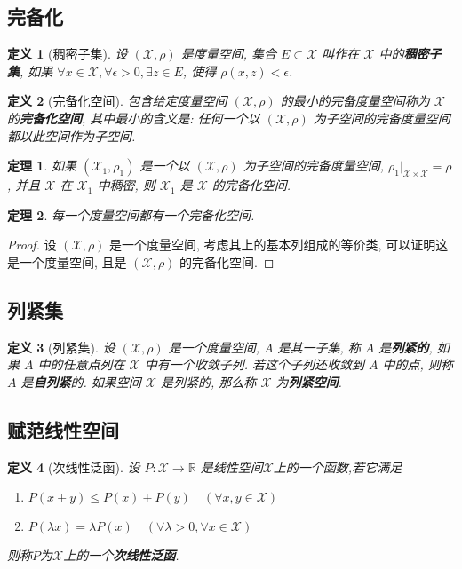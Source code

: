 \documentclass[12pt,a4paper]{article}
\newtheorem{thm}{定理}[subsection]  %
\newtheorem{definition}{定义}[subsection] %
\begin{document}
\subsection{完备化}
\begin{definition}[稠密子集]
    设 $(\mathscr{X},\rho)$ 是度量空间, 集合 $E \subset \mathscr{X}$ 叫作在 $\mathscr{X}$ 中的\textbf{稠密子集}, 如果 $\forall x \in \mathscr{X}, \forall \epsilon > 0, \exists z \in E$, 使得
     $\rho(x,z) < \epsilon$. 
\end{definition}

\begin{definition}[完备化空间]
    包含给定度量空间 $(\mathscr{X},\rho)$ 的最小的完备度量空间称为 $\mathscr{X}$ 的\textbf{完备化空间}, 其中最小的含义是: 任何一个以 $(\mathscr{X},\rho)$ 为子空间的完备度量空间都以此空间作为子空间.
\end{definition}

\begin{thm}
    如果 $(\mathscr{X}_1, \rho_1)$ 是一个以 $(\mathscr{X}, \rho)$ 为子空间的完备度量空间, $\rho_1 | _{\mathscr{X} \times \mathscr{X}} = \rho$, 并且 $\mathscr{X}$ 在 $\mathscr{X}_1$ 中稠密, 则 $\mathscr{X}_1$ 是 $\mathscr{X}$ 的完备化空间.
\end{thm}

\begin{thm}
    每一个度量空间都有一个完备化空间.
\end{thm}
\begin{proof}
    设 $(\mathscr{X}, \rho)$ 是一个度量空间, 考虑其上的基本列组成的等价类, 可以证明这是一个度量空间, 且是 $(\mathscr{X}, \rho)$ 的完备化空间.
\end{proof}

\subsection{列紧集}
\begin{definition}[列紧集]
    设 $(\mathscr{X}, \rho)$ 是一个度量空间, $A$ 是其一子集, 称 $A$ 是\textbf{列紧的}, 如果 $A$ 中的任意点列在 $\mathscr{X}$ 中有一个收敛子列. 
    若这个子列还收敛到 $A$ 中的点, 则称 $A$ 是\textbf{自列紧}的. 如果空间 $\mathscr{X}$ 是列紧的, 那么称 $\mathscr{X}$ 为\textbf{列紧空间}.
\end{definition}

\subsection{赋范线性空间}
\begin{definition}[次线性泛函]
    设 $P:\mathscr{X} \to \mathbb{R}$ 是线性空间$\mathscr{X}$上的一个函数,若它满足
    \begin{enumerate}[label=(\roman*),font=\upshape]
        \item $P(x+y) \leq P(x) + P(y) \quad (\forall x, y \in \mathscr{X})$
        \item $P(\lambda x) = \lambda P(x) \quad (\forall \lambda > 0, \forall x \in \mathscr{X})$
    \end{enumerate}
    则称$P$为$\mathscr{X}$上的一个\textbf{次线性泛函}.
\end{definition}
\end{document}
